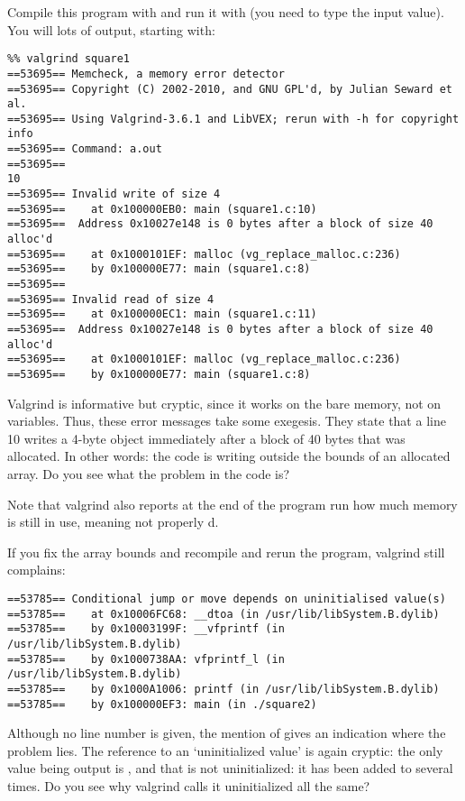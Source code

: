 %
Compile this program with  and run it with
 (you need to type the input value). You will lots
of output, starting with:
{\small
\begin{verbatim}
%% valgrind square1
==53695== Memcheck, a memory error detector
==53695== Copyright (C) 2002-2010, and GNU GPL'd, by Julian Seward et al.
==53695== Using Valgrind-3.6.1 and LibVEX; rerun with -h for copyright info
==53695== Command: a.out
==53695== 
10
==53695== Invalid write of size 4
==53695==    at 0x100000EB0: main (square1.c:10)
==53695==  Address 0x10027e148 is 0 bytes after a block of size 40 alloc'd
==53695==    at 0x1000101EF: malloc (vg_replace_malloc.c:236)
==53695==    by 0x100000E77: main (square1.c:8)
==53695== 
==53695== Invalid read of size 4
==53695==    at 0x100000EC1: main (square1.c:11)
==53695==  Address 0x10027e148 is 0 bytes after a block of size 40 alloc'd
==53695==    at 0x1000101EF: malloc (vg_replace_malloc.c:236)
==53695==    by 0x100000E77: main (square1.c:8)
\end{verbatim}
}
Valgrind is informative but cryptic, since it works on the bare
memory, not on variables. Thus, these error messages take some
exegesis. They state that a line 10 writes a 4-byte object immediately
after a block of 40 bytes that was allocated. In other words: the code
is writing outside the bounds of an allocated array. Do you see what
the problem in the code is?

Note that valgrind also reports at the end of the program run how much
memory is still in use, meaning not properly d.

If you fix the array bounds and recompile and rerun the program,
valgrind still complains:
{\small
\begin{verbatim}
==53785== Conditional jump or move depends on uninitialised value(s)
==53785==    at 0x10006FC68: __dtoa (in /usr/lib/libSystem.B.dylib)
==53785==    by 0x10003199F: __vfprintf (in /usr/lib/libSystem.B.dylib)
==53785==    by 0x1000738AA: vfprintf_l (in /usr/lib/libSystem.B.dylib)
==53785==    by 0x1000A1006: printf (in /usr/lib/libSystem.B.dylib)
==53785==    by 0x100000EF3: main (in ./square2)
\end{verbatim}
}
Although no line number is given, the mention of  gives an
indication where the problem lies.
The reference to an `uninitialized value' is again cryptic: the only
value being output is , and that is not uninitialized: it has
been added to several times. Do you see why valgrind calls it
uninitialized all the same?

